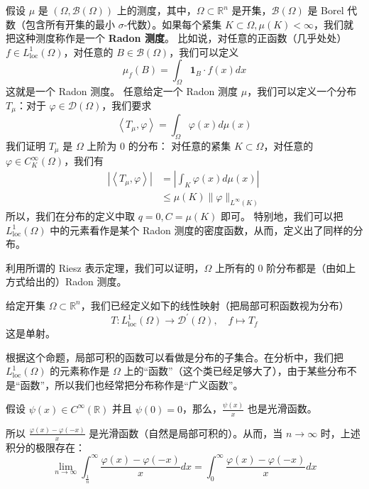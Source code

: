 \begin{example}
假设 $\mu$ 是 $(\Omega, \mathcal{B}(\Omega))$ 上的测度，其中，$\Omega \subset \mathbb{R}^n$ 是开集，$\mathcal{B}(\Omega)$ 是 Borel 代数（包含所有开集的最小 $\sigma$-代数）。如果每个紧集 $K \subset \Omega, \mu(K)<\infty$，我们就把这种测度称作是一个 \textbf{Radon 测度}。
比如说，对任意的正函数（几乎处处）$f \in L_{\mathrm{loc}}^1(\Omega)$，对任意的 $B \in \mathcal{B}(\Omega)$，我们可以定义
\[
\mu_f(B)=\int_{\Omega} \mathbf{1}_B \cdot f(x) d x
\]这就是一个 Radon 测度。
任意给定一个 Radon 测度 $\mu$，我们可以定义一个分布 $T_\mu$：对于 $\varphi \in \mathcal{D}(\Omega)$，我们要求
\[
\left\langle T_\mu, \varphi\right\rangle=\int_{\Omega} \varphi(x) d \mu(x)
\]我们证明 $T_\mu$ 是 $\Omega$ 上阶为 0 的分布：
对任意的紧集 $K \subset \Omega$，对任意的 $\varphi \in C_K^{\infty}(\Omega)$，我们有
\[
\begin{aligned}
\left|\left\langle T_\mu, \varphi\right\rangle\right| & =\left|\int_K \varphi(x) d \mu(x)\right| \\
 & \leqslant \mu(K)\|\varphi\|_{L^{\infty}(K)}
\end{aligned}
\]所以，我们在分布的定义中取 $q=0, C=\mu(K)$ 即可。
特别地，我们可以把 $L_{\mathrm{loc}}^1(\Omega)$ 中的元素看作是某个 Radon 测度的密度函数，从而，定义出了同样的分布。
\end{example}
\begin{remark}
利用所谓的 Riesz 表示定理，我们可以证明，$\Omega$ 上所有的 0 阶分布都是（由如上方式给出的）Radon 测度。
\end{remark}
\begin{proposition}
给定开集 $\Omega \subset \mathbb{R}^n$，我们已经定义如下的线性映射（把局部可积函数视为分布）
\[
T: L_{\mathrm{loc}}^1(\Omega) \rightarrow \mathcal{D}^{\prime}(\Omega), \quad f \mapsto T_f
\]这是单射。
\end{proposition}
\begin{remark}
根据这个命题，局部可积的函数可以看做是分布的子集合。在分析中，我们把 $L_{\mathrm{loc}}^1(\Omega)$ 的元素称作是 $\Omega$ 上的“函数”（这个类已经足够大了），由于某些分布不是“函数”，所以我们也经常把分布称作是“广义函数”。
\end{remark}
\begin{lemma}
假设 $\psi(x) \in C^{\infty}(\mathbb{R})$ 并且 $\psi(0)=0$，那么，$\frac{\psi(x)}{x}$ 也是光滑函数。
\end{lemma}
所以 $\frac{\varphi(x)-\varphi(-x)}{x}$ 是光滑函数（自然是局部可积的）。从而，当 $n \rightarrow \infty$ 时，上述积分的极限存在：
\[
\lim _{n \rightarrow \infty} \int_{\frac{1}{n}}^{\infty} \frac{\varphi(x)-\varphi(-x)}{x} d x=\int_0^{\infty} \frac{\varphi(x)-\varphi(-x)}{x} d x
\]
